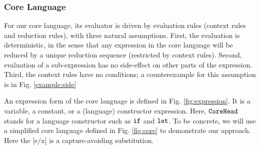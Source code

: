\subsubsection{Core Language}


For our core language,  its evaluator is driven by  evaluation rules (context rules and reduction rules), with three natural assumptions. First, the evaluation is deterministic, in the sense that any expression in the core language will be reduced by a unique reduction sequence (restricted by context rules). Second, evaluation of a sub-expression has no side-effect on other parts of the expression. Third, the context rules have no conditions; a counterexample for this assumption is in Fig. \ref{example:side} 



An expression form  of the core language is defined in Fig. \ref{fig:expression}. It is a variable, a constant, or a (language) constructor expression. Here, $\mbox{\tt CoreHead}$ stands for a language constructor such as $\mbox{\tt if}$ and $\mbox{\tt let}$. To be concrete, we will use a simplified core language defined in Fig.  \ref{fig:core} to demonstrate our approach. Here the [e/x] is a capture-avoiding substitution.

